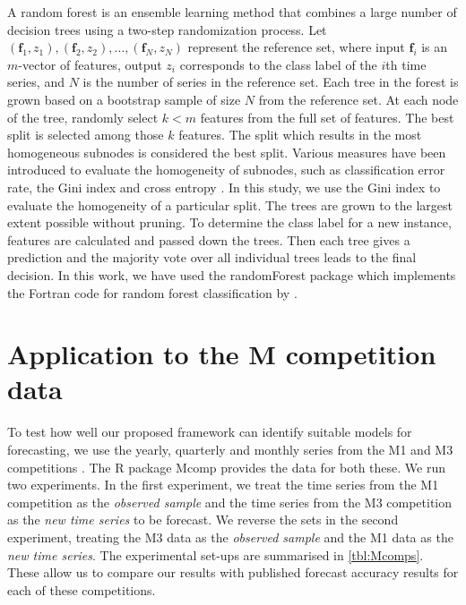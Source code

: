 \documentclass[11pt,a4paper,]{article}
\begin{document}
A random forest \autocite{breiman2001random} is an ensemble learning method that combines a large number of decision trees using a two-step randomization process. Let \((\bm{f}_1, z_1), (\bm{f}_2, z_2), \dots, (\bm{f}_N, z_N)\) represent the reference set, where input \(\bm{f}_i\) is an \(m\)-vector of features, output \(z_i\) corresponds to the class label of the \(i\)th time series, and \(N\) is the number of series in the reference set. Each tree in the forest is grown based on a bootstrap sample of size \(N\) from the reference set. At each node of the tree, randomly select \(k < m\) features from the full set of features. The best split is selected among those \(k\) features. The split which results in the most homogeneous subnodes is considered the best split. Various measures have been introduced to evaluate the homogeneity of subnodes, such as classification error rate, the Gini index and cross entropy \autocite{friedman2001elements}. In this study, we use the Gini index to evaluate the homogeneity of a particular split. The trees are grown to the largest extent possible without pruning. To determine the class label for a new instance, features are calculated and passed down the trees. Then each tree gives a prediction and the majority vote over all individual trees leads to the final decision. In this work, we have used the randomForest package \autocites{liaw2002randomforest}{rfpkg} which implements the Fortran code for random forest classification by \textcite{breiman2004random}.

\hypertarget{Mcomp}{%
\section{Application to the M competition data}\label{Mcomp}}

To test how well our proposed framework can identify suitable models for forecasting, we use the yearly, quarterly and monthly series from the M1 \autocite{makridakis1982accuracy} and M3 competitions \autocite{makridakis2000m3}. The R package Mcomp \autocite{hyndmanmcomp} provides the data for both these. We run two experiments. In the first experiment, we treat the time series from the M1 competition as the \emph{observed sample} and the time series from the M3 competition as the \emph{new time series} to be forecast. We reverse the sets in the second experiment, treating the M3 data as the \emph{observed sample} and the M1 data as the \emph{new time series}. The experimental set-ups are summarised in \autoref{tbl:Mcomps}. These allow us to compare our results with published forecast accuracy results for each of these competitions.
\end{document}

